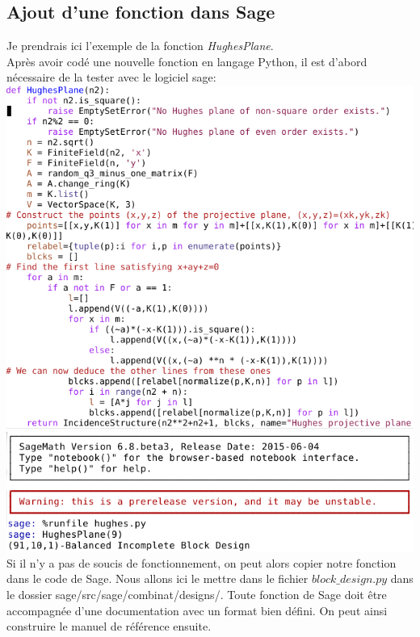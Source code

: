 \documentclass[a4paper]{article}
\begin{document}
\subsection{Ajout d'une fonction dans Sage}
Je prendrais ici l'exemple de la fonction \textit{HughesPlane}.\vspace{1\baselineskip}\\
Après avoir codé une nouvelle fonction en langage Python, il est d'abord nécessaire de la tester avec le logiciel sage:\vspace{2\baselineskip}\\
\includegraphics[scale=0.7]{hughes.png}\vspace{2\baselineskip}\\
\includegraphics[scale=0.7]{hughessage.png}\\
Si il n'y a pas de soucis de fonctionnement, on peut alors copier notre fonction dans le code de Sage. Nous allons ici le mettre dans le fichier $block\_design.py$ dans le dossier sage/src/sage/combinat/designs/.
\newpage
Toute fonction de Sage doit être accompagnée d'une documentation avec un format bien défini. On peut ainsi construire le manuel de référence ensuite.\\
\end{document}
